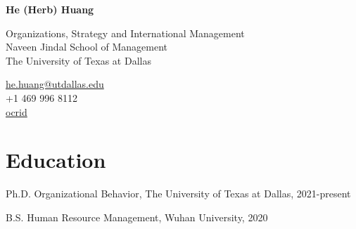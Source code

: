 \documentclass[11pt,letterpaper]{report} %
\newcommand{\myname}{He (Herb) Huang}
\newcommand{\namefont}[1]{{\normalfont\bfseries\Huge{#1}}}
\begin{document}
    \raggedright{}

    \namefont{\myname}

    \vspace{1em}
    \begin{minipage}[t]{0.700\textwidth}
        Organizations, Strategy and International Management \\
        Naveen Jindal School of Management \\
        The University of Texas at Dallas
    \end{minipage}
    \begin{minipage}[t]{0.295\textwidth}
        \flushright{}
        \href{mailto:he.huang@utdallas.edu}{he.huang@utdallas.edu} \\
        +1 469 996 8112 \\
        \href{https://orcid.org/0000-0001-5915-5988}{ocrid}
    \end{minipage}


    \section*{Education}

    \begin{tablist}

        \item[Ph.D.] \tab{}Organizational Behavior, The University of Texas at Dallas, 2021-present
        \item[B.S.]  \tab{}Human Resource Management, Wuhan University, 2020

    \end{tablist}





\end{document}
